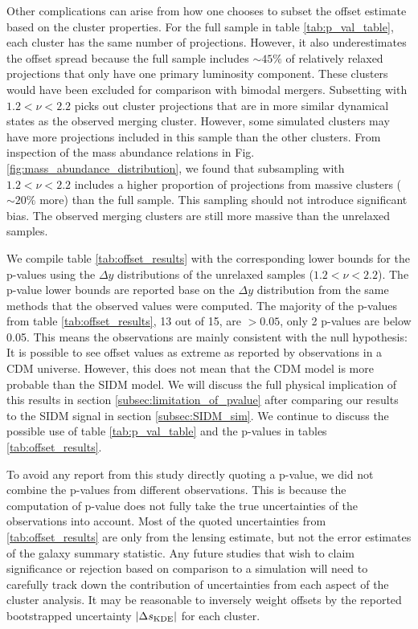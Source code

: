 Other complications can arise from how one chooses to subset the offset estimate
based on the cluster properties.
For the full sample in table \ref{tab:p_val_table},  each cluster has the same number of projections. 
However, it also underestimates the offset spread because the
full sample includes $\sim 45\%$ of relatively relaxed projections 
that only have one primary luminosity component.  These clusters would
have been excluded for comparison with bimodal mergers. 
Subsetting with $1.2 < \nu < 2.2$ picks out
cluster projections that are in more similar dynamical states as the observed merging
cluster. 
However, some simulated clusters may have more projections included in this sample
than the other clusters. From inspection of the mass abundance relations in 
Fig. \ref{fig:mass_abundance_distribution}, we found that subsampling with $1.2 <
\nu <2.2$ includes a higher proportion of projections from massive clusters
($\sim 20\%$ more) than 
the full sample. This sampling should not introduce significant bias. 
The observed merging clusters are still more massive than the unrelaxed samples. 

We compile table \ref{tab:offset_results} with the corresponding lower bounds
for the p-values using
the $\Delta y$ distributions of the unrelaxed samples ($1.2 < \nu < 2.2$). 
The p-value lower bounds are reported base on the $\Delta y$ distribution 
from the same methods that the observed values were computed. 
The majority of the p-values from table \ref{tab:offset_results}, 13 out of 15, are
$ > 0.05$, only 2 p-values are below 0.05. 
This means the observations are mainly consistent with the null hypothesis: 
It is possible to see offset values as extreme as reported by observations
in a CDM universe. 
However, this does not mean that the CDM model is more probable than the SIDM model. 
We will discuss the full physical implication of this results in section  
\ref{subsec:limitation_of_pvalue} after comparing our results to the SIDM signal 
in section \ref{subsec:SIDM_sim}. 
We continue to discuss the possible use of table \ref{tab:p_val_table} and
the p-values in tables \ref{tab:offset_results}.

To avoid any report from this study directly quoting a p-value, we did not
combine the p-values from different observations. 
This is because the computation of p-value does not fully
take the true uncertainties of the observations into account. 
Most of the quoted uncertainties from \ref{tab:offset_results} are only 
from the lensing estimate, but not the error estimates of the galaxy summary 
statistic. 
Any future studies that wish to claim significance or rejection based on
comparison to a simulation will 
need to carefully track down the contribution of uncertainties from each aspect
of the cluster analysis.  
It may be reasonable to inversely weight offsets by the 
reported bootstrapped uncertainty $|\Delta s_{\rm KDE}|$ for each cluster.

